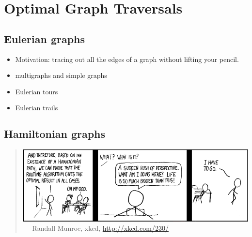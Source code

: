 
\chapter{Optimal Graph Traversals}
\label{chap:optimal_traversals}



\section{Eulerian graphs}

\begin{itemize}
\item Motivation: tracing out all the edges of a graph without lifting
  your pencil.

\item multigraphs and simple graphs

\item Eulerian tours

\item Eulerian trails
\end{itemize}



\section{Hamiltonian graphs}

\begin{quote}
\includegraphics[scale=0.7]{image/optimal-traversals/hamiltonian} \\
\noindent
--- Randall Munroe, xkcd,
\url{http://xkcd.com/230/}
\end{quote}

